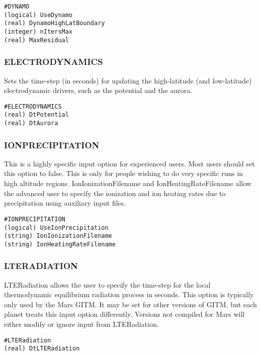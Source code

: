 \begin{verbatim}
#DYNAMO
(logical) UseDynamo   
(real) DynamoHighLatBoundary 
(integer) nItersMax        
(real) MaxResidual     
\end{verbatim}

\subsubsection{ELECTRODYNAMICS}
\label{electrodynamics.sec}

Sets the time-step (in seconds) for updating the high-latitude (and low-latitude) electrodynamic drivers, such as the potential and the aurora.

\begin{verbatim}
#ELECTRODYNAMICS
(real) DtPotential 
(real) DtAurora  
\end{verbatim}

\subsubsection{IONPRECIPITATION}
\label{ionprecipitation.sec}

This is a highly specific input option for experienced users.  Most users should set this option to false.  This is only for people wishing to do very specific runs in high altitude regions.  IonIonizationFilename and IonHeatingRateFilename allow the advanced user to specify the ionization and ion heating rates due to precipitation using auxiliary input files.

\begin{verbatim}
#IONPRECIPITATION
(logical) UseIonPrecipitation 
(string) IonIonizationFilename
(string) IonHeatingRateFilename
\end{verbatim}

\subsubsection{LTERADIATION}
\label{lteradiation.sec}

LTERadiation allows the user to specify the time-step for the local thermodynamic equilibrium radiation process in seconds.  This option is typically only used by the Mars GITM.  It may be set for other versions of GITM, but each planet treats this input option differently.  Versions not compiled for Mars will either modify or ignore input from LTERadiation.

\begin{verbatim}
#LTERadiation
(real) DtLTERadiation
\end{verbatim}

